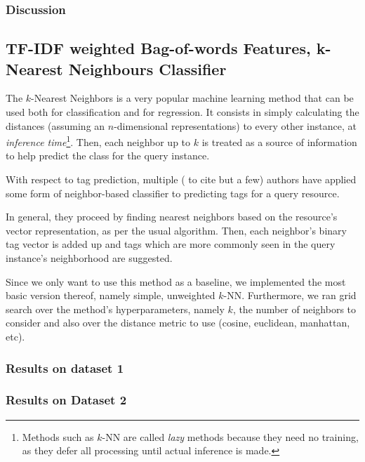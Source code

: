 \subsubsection{Discussion}


\subsection{TF-IDF weighted Bag-of-words Features, k-Nearest Neighbours Classifier}

The $k$-Nearest Neighbors is a very popular machine learning method that can be used both for classification and for regression. It consists in simply calculating the distances (assuming an $n$-dimensional representations) to every other instance, at \textit{inference time}\footnote{Methods such as $k$-NN are called \textit{lazy} methods because they need no training, as they defer all processing until actual inference is made.}. Then, each neighbor up to $k$ is treated as a source of information to help predict the class for the query instance. 

With respect to tag prediction, multiple (\cite{martinez_etal_2009,chidlovskii_2012,zhang_etal_2015} to cite but a few) authors have applied some form of neighbor-based classifier to predicting tags for a query resource. 

In general, they proceed by finding nearest neighbors based on the resource's vector representation, as per the usual algorithm. Then, each neighbor's binary tag vector is added up and tags which are more commonly seen in the query instance's neighborhood are suggested.

Since we only want to use this method as a baseline, we implemented the most basic version thereof, namely simple, unweighted $k$-NN. Furthermore, we ran grid search over the method's hyperparameters, namely $k$, the number of neighbors to consider and also over the distance metric to use (cosine, euclidean, manhattan, etc).

\subsubsection{Results on dataset 1}



\subsubsection{Results on Dataset 2}


